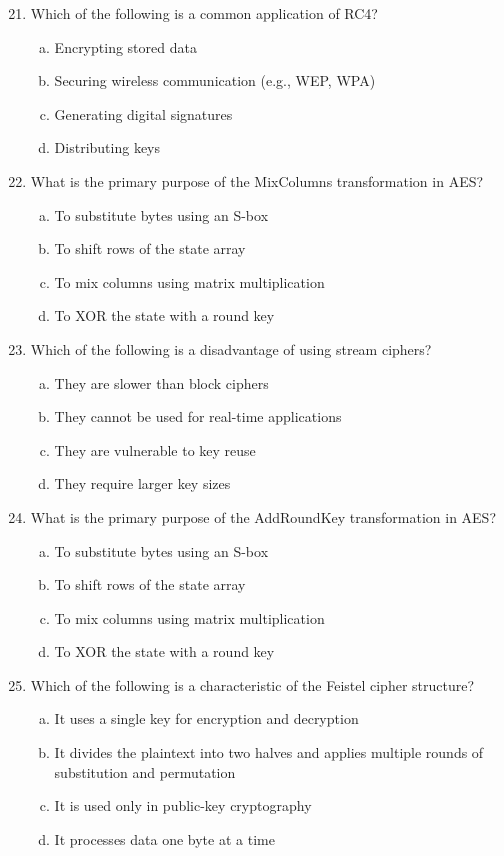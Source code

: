 \documentclass[12pt]{article}
\begin{document}
\begin{enumerate}
    \setcounter{enumi}{20}
    \item Which of the following is a common application of RC4?
    \begin{enumerate}[(a)]
        \item Encrypting stored data
        \item Securing wireless communication (e.g., WEP, WPA)
        \item Generating digital signatures
        \item Distributing keys
    \end{enumerate}

    \item What is the primary purpose of the MixColumns transformation in AES?
    \begin{enumerate}[(a)]
        \item To substitute bytes using an S-box
        \item To shift rows of the state array
        \item To mix columns using matrix multiplication
        \item To XOR the state with a round key
    \end{enumerate}

    \item Which of the following is a disadvantage of using stream ciphers?
    \begin{enumerate}[(a)]
        \item They are slower than block ciphers
        \item They cannot be used for real-time applications
        \item They are vulnerable to key reuse
        \item They require larger key sizes
    \end{enumerate}

    \item What is the primary purpose of the AddRoundKey transformation in AES?
    \begin{enumerate}[(a)]
        \item To substitute bytes using an S-box
        \item To shift rows of the state array
        \item To mix columns using matrix multiplication
        \item To XOR the state with a round key
    \end{enumerate}
\newpage
    \item Which of the following is a characteristic of the Feistel cipher structure?
    \begin{enumerate}[(a)]
        \item It uses a single key for encryption and decryption
        \item It divides the plaintext into two halves and applies multiple rounds of substitution and permutation
        \item It is used only in public-key cryptography
        \item It processes data one byte at a time
    \end{enumerate}


\end{enumerate}
\end{document}
